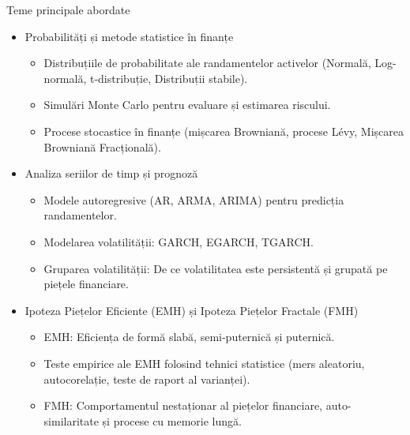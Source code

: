 \documentclass[9pt, aspectratio=169, t]{beamer}
\theoremstyle{definition}
\begin{document}
\begin{frame}{Teme principale abordate}
\begin{itemize}
    \item Probabilități și metode statistice în finanțe
    \begin{itemize}
        \item Distribuțiile de probabilitate ale randamentelor activelor (Normală, Log-normală, t-distribuție, Distribuții stabile).
        \item Simulări Monte Carlo pentru evaluare și estimarea riscului.
        \item Procese stocastice în finanțe (mișcarea Browniană, procese L\'{e}vy, Mișcarea Browniană Fracțională).
    \end{itemize}
    \item Analiza seriilor de timp și prognoză
    \begin{itemize}
        \item Modele autoregresive (AR, ARMA, ARIMA) pentru predicția randamentelor.
        \item Modelarea volatilității: GARCH, EGARCH, TGARCH.
        \item Gruparea volatilității: De ce volatilitatea este persistentă și grupată pe piețele financiare.
    \end{itemize}
    \item Ipoteza Piețelor Eficiente (EMH) și Ipoteza Piețelor Fractale (FMH)
    \begin{itemize}
        \item EMH: Eficiența de formă slabă, semi-puternică și puternică.
        \item Teste empirice ale EMH folosind tehnici statistice (mers aleatoriu, autocorelație, teste de raport al varianței).
        \item FMH: Comportamentul nestaționar al piețelor financiare, auto-similaritate și procese cu memorie lungă.
    \end{itemize}
\end{itemize}
\end{frame}
\end{document}
